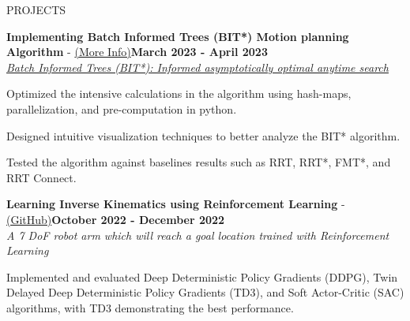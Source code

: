 \documentclass{resume} %
\begin{document}
    \begin{rSection}{PROJECTS}
	\begin{rSubsectiond}{\textbf{Implementing Batch Informed Trees (BIT*) Motion planning Algorithm} - \href{https://sahas-ananth.github.io/projects/BIT_star.html}{(More Info)}}{\textbf{March 2023 - April 2023}\\ \href{https://journals.sagepub.com/doi/pdf/10.1177/0278364919890396}{\textit{Batch Informed Trees (BIT*): Informed asymptotically optimal anytime search}}}
	\item Optimized the intensive calculations in the algorithm using hash-maps, parallelization, and pre-computation in python.
	\item Designed intuitive visualization techniques to better analyze the BIT* algorithm.
	\item Tested the algorithm against baselines results such as RRT, RRT*, FMT*, and RRT Connect.
	\end{rSubsectiond}

	\begin{rSubsectiond}{\textbf{Learning Inverse Kinematics using Reinforcement Learning} -  \href{https://github.com/Sahas-Ananth/RL-FinalProject}{(GitHub)}}{\textbf{October 2022 - December 2022}\\\textit{A 7 DoF robot arm which will reach a goal location trained with Reinforcement Learning}}
	    \item Implemented and evaluated Deep Deterministic Policy Gradients (DDPG), Twin Delayed Deep Deterministic Policy Gradients (TD3), and Soft Actor-Critic (SAC) algorithms, with TD3 demonstrating the best performance. 
	\end{rSubsectiond}


\end{rSection}
\end{document}
